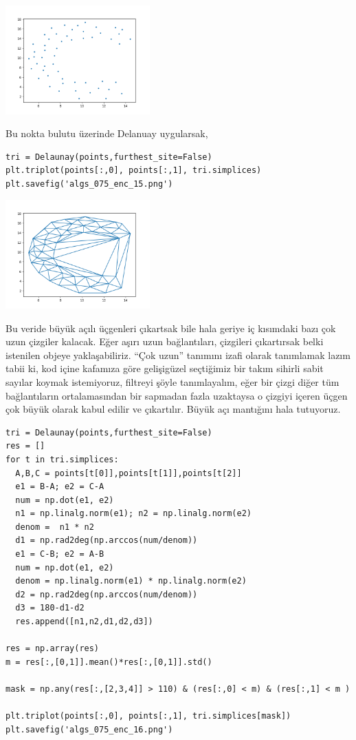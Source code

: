 \documentclass[12pt,fleqn]{article}\usepackage{../../common}
\begin{document}
\includegraphics[width=15em]{algs_075_enc_14.png}

Bu nokta bulutu üzerinde Delanuay uygularsak,

\begin{verbatim}
tri = Delaunay(points,furthest_site=False)
plt.triplot(points[:,0], points[:,1], tri.simplices)
plt.savefig('algs_075_enc_15.png')
\end{verbatim}

\includegraphics[width=15em]{algs_075_enc_15.png}

Bu veride büyük açılı üçgenleri çıkartsak bile hala geriye iç kısımdaki bazı çok
uzun çizgiler kalacak. Eğer aşırı uzun bağlantıları, çizgileri çıkartırsak belki
istenilen objeye yaklaşabiliriz. ``Çok uzun'' tanımını izafi olarak tanımlamak
lazım tabii ki, kod içine kafamıza göre gelişigüzel seçtiğimiz bir takım sihirli
sabit sayılar koymak istemiyoruz, filtreyi şöyle tanımlayalım, eğer bir çizgi
diğer tüm bağlantıların ortalamasından bir sapmadan fazla uzaktaysa o çizgiyi
içeren üçgen çok büyük olarak kabul edilir ve çıkartılır. Büyük açı mantığını
hala tutuyoruz.


\begin{verbatim}
tri = Delaunay(points,furthest_site=False)
res = []
for t in tri.simplices:
  A,B,C = points[t[0]],points[t[1]],points[t[2]]
  e1 = B-A; e2 = C-A
  num = np.dot(e1, e2)
  n1 = np.linalg.norm(e1); n2 = np.linalg.norm(e2)
  denom =  n1 * n2
  d1 = np.rad2deg(np.arccos(num/denom))
  e1 = C-B; e2 = A-B
  num = np.dot(e1, e2)
  denom = np.linalg.norm(e1) * np.linalg.norm(e2)
  d2 = np.rad2deg(np.arccos(num/denom))
  d3 = 180-d1-d2
  res.append([n1,n2,d1,d2,d3])

res = np.array(res)
m = res[:,[0,1]].mean()*res[:,[0,1]].std()

mask = np.any(res[:,[2,3,4]] > 110) & (res[:,0] < m) & (res[:,1] < m )

plt.triplot(points[:,0], points[:,1], tri.simplices[mask])
plt.savefig('algs_075_enc_16.png')
\end{verbatim}
\end{document}
